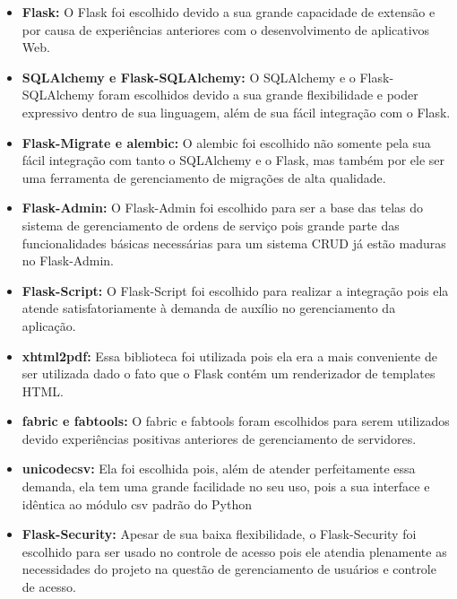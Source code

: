 \documentclass[
	article,			%
	11pt,				%
	oneside,			%
	a4paper,			%
	english,			%
	brazil,				%
	sumario=tradicional
	]{abntex2}
\begin{document}
\begin{itemize}
\item \textbf{Flask:} O Flask foi escolhido devido a sua grande capacidade de extensão e por causa de experiências anteriores com o desenvolvimento de aplicativos Web.

\item \textbf{SQLAlchemy e Flask-SQLAlchemy:} O SQLAlchemy e o Flask-SQLAlchemy foram escolhidos devido a sua grande flexibilidade e poder expressivo dentro de sua linguagem, além de sua fácil integração com o Flask.

\item \textbf{Flask-Migrate e alembic:} O alembic foi escolhido não somente pela sua fácil integração com tanto o SQLAlchemy e o Flask, mas também por ele ser uma ferramenta de gerenciamento de migrações de alta qualidade.

\item \textbf{Flask-Admin:} O Flask-Admin foi escolhido para ser a base das telas do sistema de gerenciamento de ordens de serviço pois grande parte das funcionalidades básicas necessárias para um sistema CRUD já estão maduras no Flask-Admin.

\item \textbf{Flask-Script:} O Flask-Script foi escolhido para realizar a integração pois ela atende satisfatoriamente à demanda de auxílio no gerenciamento da aplicação.

\item \textbf{xhtml2pdf:} Essa biblioteca foi utilizada pois ela era a mais conveniente de ser utilizada dado o fato que o Flask contém um renderizador de templates HTML.

\item \textbf{fabric e fabtools:} O fabric e fabtools foram escolhidos para serem utilizados devido experiências positivas anteriores de gerenciamento de servidores.

\item \textbf{unicodecsv:} Ela foi escolhida pois, além de atender perfeitamente essa demanda, ela tem uma grande facilidade no seu uso, pois a sua interface e idêntica ao módulo csv padrão do Python

\item \textbf{Flask-Security:} Apesar de sua baixa flexibilidade, o Flask-Security foi escolhido para ser usado no controle de acesso pois ele atendia plenamente as necessidades do projeto na questão de gerenciamento de usuários e controle de acesso.
\end{itemize}
\end{document}
